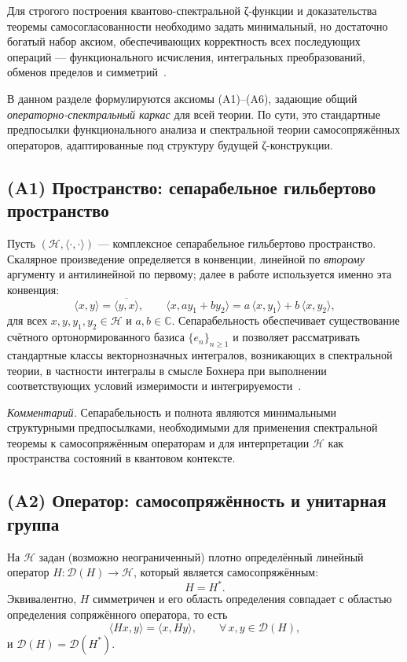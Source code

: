 \documentclass{article}
\numberwithin{equation}{section}
\theoremstyle{plain}
\theoremstyle{definition}
\theoremstyle{remark}
\def\cdot{·}\def\times{×}\def\pm{±}\def\mp{∓}\def\approx{≈}%
\begin{document}
\noindent
Для строгого построения квантово-спектральной ζ-функции и доказательства теоремы самосогласованности необходимо задать минимальный, но достаточно богатый набор аксиом, обеспечивающих корректность всех последующих операций — функционального исчисления, интегральных преобразований, обменов пределов и симметрий~\cite{ReedSimon1}.

В данном разделе формулируются аксиомы (A1)–(A6), задающие общий \emph{операторно-спектральный каркас} для всей теории.  
По сути, это стандартные предпосылки функционального анализа и спектральной теории самосопряжённых операторов, адаптированные под структуру будущей ζ-конструкции.

\subsection{(A1) Пространство: сепарабельное гильбертово пространство}

\noindent
Пусть $(\mathcal H,\langle\cdot,\cdot\rangle)$ — комплексное сепарабельное гильбертово пространство.
Скалярное произведение определяется в конвенции, линейной по \emph{второму} аргументу
и антилинейной по первому; далее в работе используется именно эта конвенция:
\begin{equation}
\langle x,y\rangle = \overline{\langle y,x\rangle}, 
\qquad 
\langle x,ay_1+by_2\rangle = a\,\langle x,y_1\rangle + b\,\langle x,y_2\rangle,
\end{equation}
для всех $x,y,y_1,y_2\in\mathcal H$ и $a,b\in\mathbb C$.
Сепарабельность обеспечивает существование счётного ортонормированного базиса
$\{e_n\}_{n\ge1}$ и позволяет рассматривать стандартные классы
векторнозначных интегралов, возникающих в спектральной теории,
в частности интегралы в смысле Бохнера при выполнении соответствующих
условий измеримости и интегрируемости~\cite{HillePhillips1957}.

\emph{Комментарий.}
Сепарабельность и полнота являются минимальными структурными предпосылками,
необходимыми для применения спектральной теоремы к самосопряжённым операторам
и для интерпретации $\mathcal H$ как пространства состояний в квантовом контексте.

\subsection{(A2) Оператор: самосопряжённость и унитарная группа}

\noindent
На $\mathcal H$ задан (возможно неограниченный) плотно определённый линейный оператор
$H:\mathcal D(H)\to\mathcal H$, который является самосопряжённым:
\begin{equation}
H=H^\ast .
\end{equation}
Эквивалентно, $H$ симметричен и его область определения совпадает с областью определения
сопряжённого оператора, то есть
\begin{equation}
\langle Hx,y\rangle=\langle x,Hy\rangle,
\qquad \forall\,x,y\in\mathcal D(H),
\end{equation}
и $\mathcal D(H)=\mathcal D(H^\ast)$.
\end{document}
